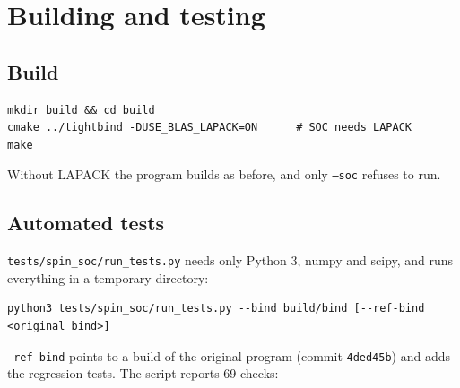 \documentclass[11pt,a4paper]{article}
\newcommand{\file}[1]{\texttt{#1}}
\newcommand{\opt}[1]{\texttt{#1}}
\begin{document}
\section{Building and testing}

\subsection{Build}

\begin{lstlisting}[style=sh]
mkdir build && cd build
cmake ../tightbind -DUSE_BLAS_LAPACK=ON      # SOC needs LAPACK
make
\end{lstlisting}
Without LAPACK the program builds as before, and only \opt{--soc} refuses to run.

\subsection{Automated tests}

\file{tests/spin\_soc/run\_tests.py} needs only Python 3, numpy and scipy, and runs
everything in a temporary directory:
\begin{lstlisting}[style=sh]
python3 tests/spin_soc/run_tests.py --bind build/bind [--ref-bind <original bind>]
\end{lstlisting}
\texttt{--ref-bind} points to a build of the original program (commit \texttt{4ded45b})
and adds the regression tests. The script reports 69 checks:
\end{document}
